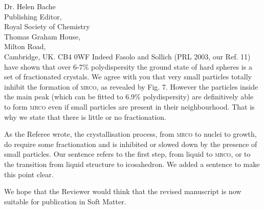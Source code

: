 \documentclass[a4paper, rebuttal, parskip=true, firsthead=false, fromemail=true, foldmarks=false]{scrlttr2}
\begin{document}
\begin{letter}{Dr. Helen Bache\\
Publishing Editor,\\
Royal Society of Chemistry\\
Thomas Graham House,\\
Milton Road,\\
Cambridge, UK. CB4 0WF}
Indeed Fasolo and Sollich (PRL 2003, our Ref. 11) have shown that over 6-7\% polydispersity the ground state of hard spheres is a set of fractionated crystals. We agree with you that very small particles totally inhibit the formation of \textsc{mrco}, as revealed by Fig. 7. However the particles inside the main peak (which can be fitted to 6.9\% polydispersity) are definitively able to form \textsc{mrco} even if small particles are present in their neighbourhood. That is why we state that there is little or no fractionation.

As the Referee wrote, the crystallisation process, from \textsc{mrco} to nuclei to growth, do require some fractionation and is inhibited or slowed down by the presence of small particles. Our sentence refers to the first step, from liquid to \textsc{mrco}, or to the transition from liquid structure to icosahedron. We added a sentence to make this point clear.

We hope that the Reviewer would think that the revised manuscript is now suitable for publication in Soft Matter. 


\end{letter} 
\end{document}
